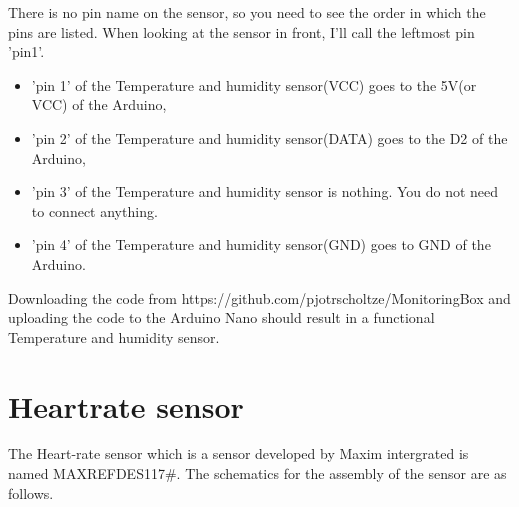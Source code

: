 \documentclass{report}
\begin{document}
There is no pin name on the sensor, so you need to see the order in which the pins are listed. When looking at the sensor in front, I'll call the leftmost pin 'pin1'.\\

\begin{itemize}
\item 'pin 1' of the Temperature and humidity sensor(VCC) goes to the 5V(or VCC) of the Arduino, 
\item 'pin 2' of the Temperature and humidity sensor(DATA) goes to the D2 of the Arduino,
\item 'pin 3' of the Temperature and humidity sensor is nothing. You do not need to connect anything.
\item 'pin 4' of the Temperature and humidity sensor(GND) goes to GND of the Arduino.
\end{itemize}
 
Downloading the code from https://github.com/pjotrscholtze/MonitoringBox and uploading the code to the Arduino Nano should result in a functional Temperature and humidity sensor.\\


\chapter{Heartrate sensor}
The Heart-rate sensor which is a sensor developed by Maxim intergrated is named MAXREFDES117\#. The schematics for the assembly of the sensor are as follows.\\
\end{document}
